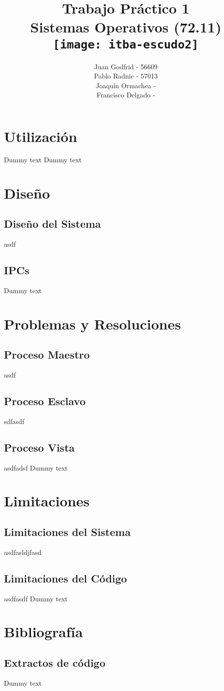 \documentclass[10pt,a4paper]{report}
\title{
	\bf\color{darkcerulean} Trabajo Práctico 1 \\
	\color{black}Sistemas Operativos (72.11) \\
	\texttt{[image: itba-escudo2]}
	}
\author{Juan Godfrid - 56609 \\Pablo Radnic - 57013 \\ Joaquín Ormachea - \\Francisco Delgado -}
\begin{document}
\maketitle

\newpage
\tableofcontents
\newpage


\chapter{Utilización}

Dummy text
Dummy text


\chapter{Diseño}
\section{Diseño del Sistema}
asdf
\section{IPCs}
Dummy text


\chapter{Problemas y Resoluciones}
\section{Proceso Maestro}
asdf
\section{Proceso Esclavo}
sdfasdf
\section{Proceso Vista}
asdfadsf
Dummy text


\chapter{Limitaciones}
\section{Limitaciones del Sistema}
asdfasldjfasd

\section{Limitaciones del Código}
asdfasdf
Dummy text


\chapter{Bibliografía}
\section{Extractos de código}

Dummy text
\end{document}
